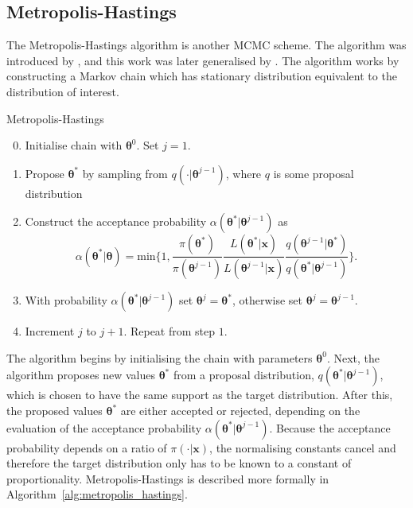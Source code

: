 \subsection{Metropolis-Hastings}
\label{ssec:metropolis_hastings}
The Metropolis-Hastings algorithm is another MCMC scheme. The algorithm was introduced by \cite{metropolis53}, and this work was later generalised by \cite{hastings70}. The algorithm works by constructing a Markov chain which has stationary distribution equivalent to the distribution of interest.
\begin{algorithm}
	\caption{Metropolis-Hastings}
	\label{alg:metropolis_hastings}
	\begin{enumerate}
	    \setcounter{enumi}{-1}
	    \item Initialise chain with $\bm{\theta}^{0}$. Set $j=1$.
	    \item Propose ${\bm{\theta}}^*$ by sampling from $q(\cdot|{\bm{\theta}}^{j-1})$, where $q$ is some proposal distribution
	    \item Construct the acceptance probability $\alpha({\bm{\theta}}^*|{\bm{\theta}^{j-1}})$ as
	    \begin{equation*}
			\alpha({\bm{\theta}}^*|\bm{\theta}) = \text{min}\bigg\{ 1, \frac{\pi({\bm{\theta}}^*)}{\pi({\bm{\theta}}^{j-1})} \frac{L(\bm{\theta}^*|\bm{x})}{L({\bm{\theta}}^{j-1}|\bm{x})} \frac{q({\bm{\theta}}^{j-1}|{\bm{\theta}}^*)}{q({\bm{\theta}}^*|{\bm{\theta}}^{j-1})} \bigg\}.
	    \end{equation*}
	    \item With probability $\alpha({\bm{\theta}}^*|{\bm{\theta}^{j-1}})$ set ${\bm{\theta}}^j = {\bm{\theta}}^*$, otherwise set ${\bm{\theta}}^j = {\bm{\theta}}^{j-1}$.
	    \item Increment $j$ to $j+1$. Repeat from step $1$.
	\end{enumerate}
\end{algorithm}

The algorithm begins by initialising the chain with parameters $\bm{\theta}^{0}$. Next, the algorithm proposes new values ${\bm{\theta}}^*$ from a proposal distribution, $q(\bm{\theta}^*|{\bm{\theta}}^{j-1})$, which is chosen to have the same support as the target distribution. After this, the proposed values ${\bm{\theta}}^*$ are either accepted or rejected, depending on the evaluation of the acceptance probability $\alpha({\bm{\theta}}^*|{\bm{\theta}^{j-1}})$. Because the acceptance probability depends on a ratio of $\pi(\cdot|\bm{x})$, the normalising constants cancel and therefore the target distribution only has to be known to a constant of proportionality. Metropolis-Hastings is described more formally in Algorithm~\ref{alg:metropolis_hastings}.

